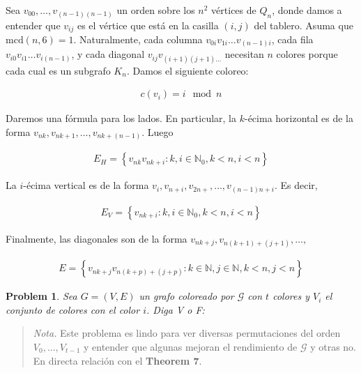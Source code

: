 \documentclass[a4paper]{article}
\newtheorem{problem}{Problem}
\newtheorem{problem}{Problem}
\begin{document}
Sea $v_{00}, \ldots, v_{(n-1)(n-1)}$ un orden sobre los $n^2$ vértices de $Q_n$,
donde damos a entender que $v_{ij}$ es el vértice que está en la casilla $(i,
j)$ del tablero. Asuma que $\text{mcd}(n, 6) = 1$. Naturalmente, cada columna
$v_{0i}v_{1i}\ldots v_{(n-1)i}$, cada fila $v_{i 0}v_{i 1}\ldots v_{i (n - 1)}$,
y cada diagonal $v_{ij}v_{(i+1)(j+1) \ldots}$ necesitan $n$ colores porque
cada cual es un subgrafo $K_n$. Damos el siguiente coloreo: 

\begin{align*}
    c(v_i) = i \mod n
\end{align*}




Daremos una
fórmula para los lados. En particular, la $k$-écima horizontal es de la forma
$v_{nk}, v_{nk+1}, \ldots, v_{nk + (n -1)}$. Luego

\begin{align*}
    E_{H} = \left\{ v_{nk} v_{nk + i} : k, i \in  \mathbb{N}_0, k < n, i < n \right\}  
\end{align*}

La $i$-écima vertical es de la forma $v_{i}, v_{n + i}, v_{2n + }, \ldots,
v_{(n - 1)n + i}$. Es decir, 

\begin{align*}
    E_V = \left\{ v_{nk + i} : k, i \in \mathbb{N}_0, k < n, i < n \right\} 
\end{align*}

Finalmente, las diagonales son de la forma $v_{nk + j}, v_{n(k+1) + (j + 1)},
\ldots , $

\begin{align*}
    E = \left\{ v_{nk + j}v_{n(k+p) + (j + p)} : k \in \mathbb{N}, j \in
    \mathbb{N}, k < n, j < n \right\} 
\end{align*}

\pagebreak 

\begin{problem}
    Sea $G = (V, E) $ un grafo coloreado por $\mathscr{G}$ con $t$ colores y $V_i$ el
    conjunto de colores con el color $i$. Diga V o F:
\end{problem}


\small
\begin{quote}

\textit{Nota.} Este problema es lindo para ver diversas permutaciones del orden
$V_0, \ldots, V_{t - 1}$ y entender que algunas mejoran el rendimiento de $\mathscr{G}$
y otras no. En directa relación con el \textbf{Theorem 7}.

\end{quote}
\normalsize
\end{document}
